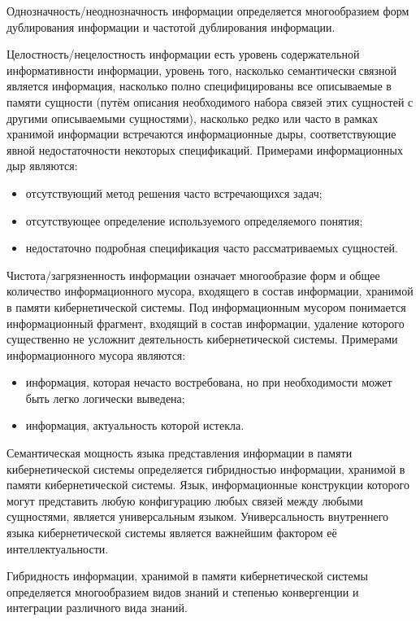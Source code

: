 Однозначность/неоднозначность информации определяется многообразием форм дублирования информации и частотой дублирования информации.

Целостность/нецелостность информации есть уровень содержательной информативности информации, уровень того, насколько семантически связной является информация, насколько полно специфицированы все описываемые в памяти сущности (путём описания необходимого набора связей этих сущностей с другими описываемыми сущностями), насколько редко или часто в рамках хранимой информации встречаются информационные дыры, соответствующие явной недостаточности некоторых спецификаций. 
Примерами информационных дыр являются:
\begin{itemize}
    \item{отсутствующий метод решения часто встречающихся задач;}
    \item{отсутствующее определение используемого определяемого понятия;}
    \item{недостаточно подробная спецификация часто рассматриваемых сущностей.}
\end{itemize}

Чистота/загрязненность информации означает многообразие форм и общее количество информационного мусора, входящего в состав информации, хранимой в памяти кибернетической системы.
Под информационным мусором понимается информационный фрагмент, входящий в состав информации, удаление которого существенно не усложнит деятельность кибернетической системы.
Примерами информационного мусора являются:
\begin{itemize}
    \item{информация, которая нечасто востребована, но при необходимости может быть легко логически выведена;}
    \item{информация, актуальность которой истекла.}
\end{itemize}

Семантическая мощность языка представления информации в памяти кибернетической системы определяется гибридностью информации, хранимой в памяти кибернетической системы.
Язык, информационные конструкции которого могут представить любую конфигурацию любых связей между любыми сущностями, является универсальным языком.
Универсальность внутреннего языка кибернетической системы является важнейшим фактором её интеллектуальности.

Гибридность информации, хранимой в памяти кибернетической системы определяется многообразием видов знаний и степенью конвергенции и интеграции различного вида знаний.

